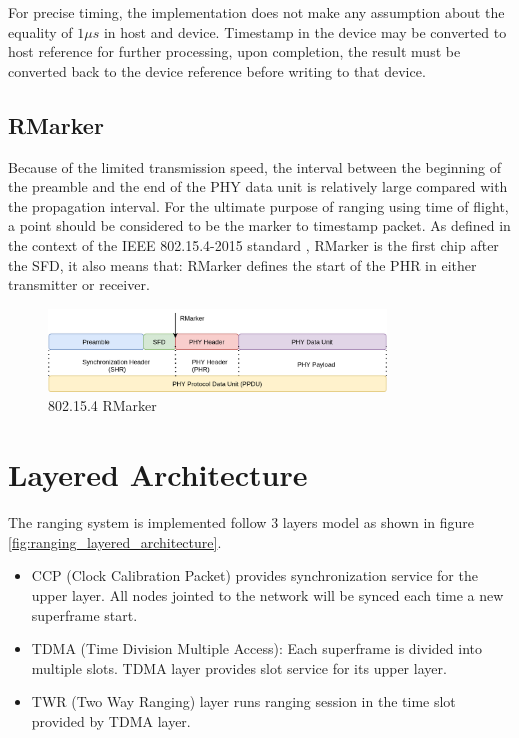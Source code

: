 \documentclass[\main/thesis.tex]{subfiles}
\begin{document}
For precise timing, the implementation does not make any assumption about the equality of $1\mu s$ in host and device. Timestamp in the device may be converted to host reference for further processing, upon completion, the result must be converted back to the device reference before writing to that device. 
\subsection{RMarker}
Because of the limited transmission speed, the interval between the beginning of the preamble and the end of the PHY data unit is relatively large compared with the propagation interval. For the ultimate purpose of ranging using time of flight, a point should be considered to be the marker to timestamp packet. As defined in the context of the IEEE 802.15.4-2015 standard \cite{IEEE_Std_802_15_4_2015}, RMarker is the first chip after the SFD, it also means that: RMarker defines the start of the PHR in either transmitter or receiver.

\begin{figure}[H]
    \begin{center}
        \includegraphics[width=0.8\textwidth]{802_15_4_physical.png}
    \end{center}
    \caption{802.15.4 RMarker}
    \label{fig:802_15_4_rmarker}
\end{figure}

\section{Layered Architecture}
The ranging system is implemented follow 3 layers model as shown in figure \ref{fig:ranging_layered_architecture}. 
\begin{itemize}
    \item CCP (Clock Calibration Packet) provides synchronization service for the upper layer. All nodes jointed to the network will be synced each time a new superframe start.
    \item TDMA (Time Division Multiple Access): Each superframe is divided into multiple slots. TDMA layer provides slot service for its upper layer. 
    \item TWR (Two Way Ranging) layer runs ranging session in the time slot provided by TDMA layer.
\end{itemize}
\end{document}
